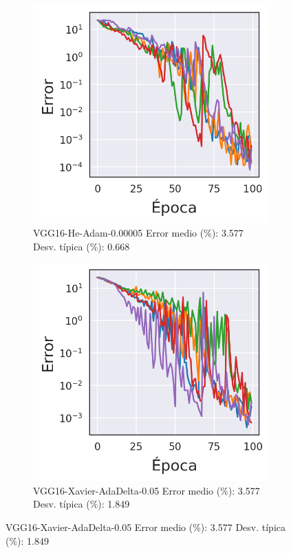 \begin{figure}[H]
    \bigskip

    \begin{subfigure}{.45\textwidth}
        \centering
        \includegraphics[width=1\linewidth]{imagenes/image_classification/original_dataset/loss_vgg16_he_adam_00005.png}
        \caption{VGG16-He-Adam-0.00005 \hspace{\textwidth} Error medio (\%): 3.577 \hspace{\textwidth} Desv. típica (\%): 0.668}
    \end{subfigure}%
    \begin{subfigure}{.45\textwidth}
        \centering
        \includegraphics[width=1\linewidth]{imagenes/image_classification/original_dataset/loss_vgg16_xavier_adadelta_05.png}
        \caption{VGG16-Xavier-AdaDelta-0.05 \hspace{\textwidth} Error medio (\%): 3.577 \hspace{\textwidth} Desv. típica (\%): 1.849}
    \end{subfigure}


\end{figure}
